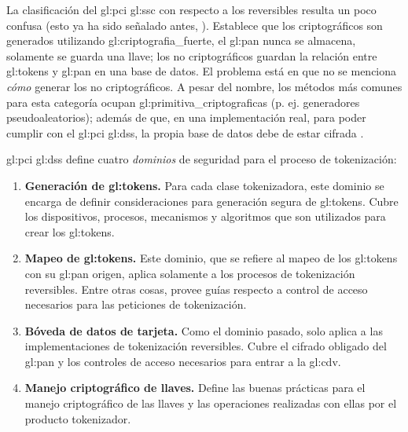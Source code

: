 La clasificación del \gls{gl:pci} \gls{gl:ssc} con respecto a los reversibles
resulta un poco confusa (esto ya ha sido señalado antes, \cite{doc_sandra}).
Establece que los criptográficos son generados utilizando
\gls{gl:criptografia_fuerte}, el \gls{gl:pan} nunca se almacena, solamente se
guarda una llave; los no criptográficos guardan la relación entre
\glspl{gl:token} y \gls{gl:pan} en una base de datos. El problema está en que
no se menciona \textit{cómo} generar los no criptográficos. A pesar del nombre,
los métodos más comunes para esta categoría ocupan
\glspl{gl:primitiva_criptografica} (p. ej. generadores pseudoaleatorios); además
de que, en una implementación real, para poder cumplir con el \gls{gl:pci}
\gls{gl:dss}, la propia base de datos debe de estar cifrada \cite{pci_dss}.

\gls{gl:pci} \gls{gl:dss} define cuatro \textit{dominios} de seguridad para el
proceso de tokenización:

\begin{enumerate}

  \item \label{dm:gen_tokens} \textbf{Generación de \glspl{gl:token}.}
    Para cada clase tokenizadora, este dominio se encarga de definir
    consideraciones para generación segura de \glspl{gl:token}. Cubre los
    dispositivos, procesos, mecanismos y algoritmos que son utilizados para
    crear los \glspl{gl:token}.

  \item \label{dm:mapeo_tokens} \textbf{Mapeo de \glspl{gl:token}.}
    Este dominio, que se refiere al mapeo de los \glspl{gl:token} con su
    \gls{gl:pan} origen, aplica solamente a los procesos de tokenización
    reversibles. Entre otras cosas, provee guías respecto a control de acceso
    necesarios para las peticiones de tokenización.

  \item \label{dm:card_data} \textbf{Bóveda de datos de tarjeta.}
    Como el dominio pasado, solo aplica a las implementaciones de tokenización
    reversibles. Cubre el cifrado obligado del \gls{gl:pan} y los controles de
    acceso necesarios para entrar a la \gls{gl:cdv}.

  \item \label{dm:man_llaves} \textbf{Manejo criptográfico de llaves.}
    Define las buenas prácticas para el manejo criptográfico de las llaves y
    las operaciones realizadas con ellas por el producto tokenizador.

\end{enumerate}

